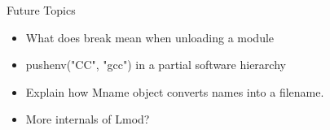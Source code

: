 \documentclass{beamer}
\begin{document}
\begin{frame}{Future Topics}
  \begin{itemize}
    \item What does break mean when unloading a module
    \item pushenv("CC", "gcc") in a partial software hierarchy
    \item Explain how Mname object converts names into a filename.
    \item More internals of Lmod?
  \end{itemize}
\end{frame}
\end{document}
